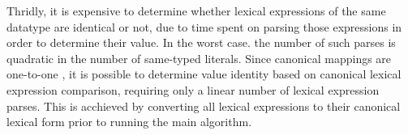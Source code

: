 Thridly, it is expensive to determine whether lexical expressions
  of the same datatype are identical or not,
  due to time spent on parsing those expressions
  in order to determine their value.
In the worst case. the number of such parses is quadratic
  in the number of same-typed literals.
Since canonical mappings are one-to-one \cite{XmlSchema2012},
  it is possible to determine value identity based on
  canonical lexical expression comparison,
  requiring only a linear number of lexical expression parses.
This is acchieved by converting all lexical expressions
  to their canonical lexical form prior to running the main algorithm.

